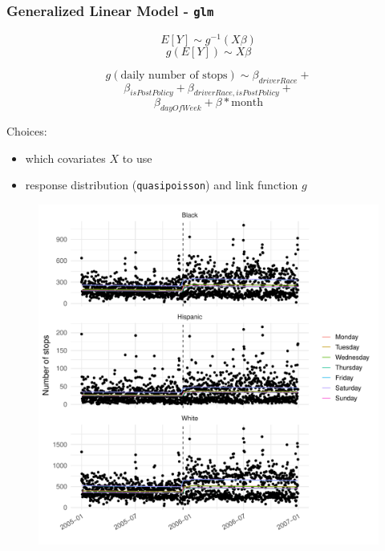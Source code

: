 \documentclass{beamer}
\begin{document}
\begin{frame}
\frametitle{Generalized Linear Model - \texttt{glm}}

\begin{multicols}{2}

$$ E[Y] \sim g^{-1}(X\beta) $$
$$ g(E[Y]) \sim X\beta $$

$$g(\text{daily number of stops}) \sim \beta_{driverRace} + $$
$$\beta_{isPostPolicy}+ \beta_{driverRace, isPostPolicy}+$$
$$ \beta_{dayOfWeek} + \beta*\text{month} $$


Choices:

\begin{itemize}
\item which covariates $X$ to use
\item response distribution (\texttt{quasipoisson}) and link function $g$
\end{itemize}

\columnbreak

\begin{figure}
\includegraphics[scale=.3]{figures/glmResults}
\end{figure}

\end{multicols}


\end{frame}
\end{document}
